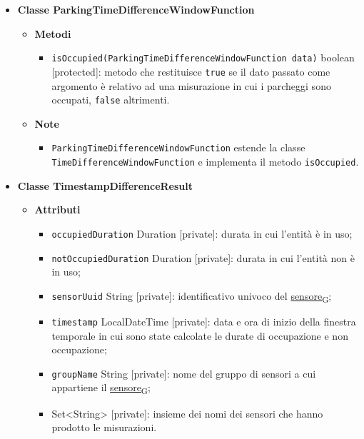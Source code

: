 \begin{itemize}
	\item \textbf{Classe ParkingTimeDifferenceWindowFunction}
	      \begin{itemize}
		      \item \textbf{Metodi}
		            \begin{itemize}
			            \item \texttt{isOccupied(ParkingTimeDifferenceWindowFunction data)} boolean [protected]: metodo che restituisce \texttt{true} se il dato passato come argomento è relativo ad una misurazione in cui i
			                  parcheggi sono occupati, \texttt{false} altrimenti.
		            \end{itemize}
		      \item \textbf{Note}
		            \begin{itemize}
			            \item \texttt{ParkingTimeDifferenceWindowFunction} estende la classe \\\texttt{TimeDifferenceWindowFunction} e implementa il metodo \texttt{isOccupied}.
		            \end{itemize}
	      \end{itemize}
	\item \textbf{Classe TimestampDifferenceResult}
	      \begin{itemize}
		      \item \textbf{Attributi}
		            \begin{itemize}
			            \item \texttt{occupiedDuration} Duration [private]: durata in cui l'entità è in uso;
			            \item \texttt{notOccupiedDuration} Duration [private]: durata in cui l'entità non è in uso;
			            \item \texttt{sensorUuid} String [private]: identificativo univoco del \href{https://7last.github.io/docs/pb/documentazione-interna/glossario\#sensore}{sensore\textsubscript{G}};
			            \item \texttt{timestamp} LocalDateTime [private]: data e ora di inizio della finestra temporale in cui sono state calcolate le durate di occupazione e non occupazione;
			            \item \texttt{groupName} String [private]: nome del gruppo di sensori a cui appartiene il \href{https://7last.github.io/docs/pb/documentazione-interna/glossario\#sensore}{sensore\textsubscript{G}};
			            \item \texttt{} Set<String> [private]: insieme dei nomi dei sensori che hanno prodotto le misurazioni.

\end{itemize}
\end{itemize}
\end{itemize}
